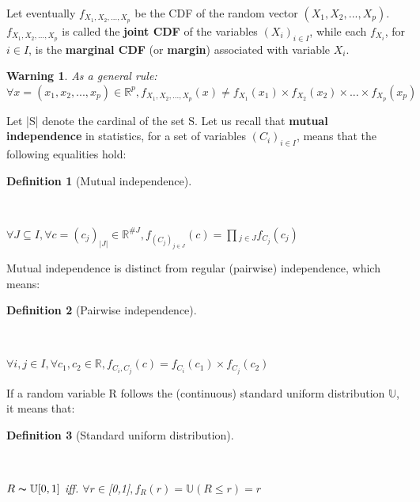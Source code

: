 \documentclass{report}
\newtheorem{definition}{Definition}[section]
\newtheorem{warning}{Warning}[section]
\begin{document}
{Let eventually $f_{X_1, X_2, ..., X_p}$ be the CDF of the random vector $(X_1, X_2, ..., X_p)$. $f_{X_1, X_2, ..., X_p}$ is called the \textbf{joint CDF} of the variables $(X_i)_{i \in I}$, while each $f_{X_i}$, for $i \in I$, is the \textbf{marginal CDF} (or \textbf{margin}) associated with variable $X_i$.

\begin{warning}{As a general rule:\\$\forall x = (x_1, x_2, ..., x_p) \in \mathbb{R}^p, f_{X_1, X_2, ..., X_p}(x) \neq f_{X_1}(x_1) \times f_{X_2}(x_2) \times ... \times f_{X_p}(x_p)$}\end{warning}

Let |S| denote the cardinal of the set S. Let us recall that \textbf{mutual independence} in statistics, for a set of variables $(C_i)_{i \in I}$, means that the following equalities hold:

\begin{definition}[Mutual independence]\label{mutualindependence}{~ \\ \begin{center}$\forall J \subseteq I, \forall c = (c_j)_{|J|} \in \mathbb{R}^{\#J}, f_{(C_j)_{j \in J}}(c) = \prod{_{j \in J}}{f_{C_j}(c_j)}$\end{center}}\end{definition}

Mutual independence is distinct from regular (pairwise) independence, which means:

\begin{definition}[Pairwise independence]\label{independence}{~ \\\begin{center}$\forall i, j \in I, \forall c_1, c_2 \in \mathbb{R}, f_{C_i, C_j}(c) = f_{C_i}(c_1) \times f_{C_j}(c_2)$\end{center}}\end{definition}

If a random variable R follows the (continuous) standard uniform distribution $\mathbb{U}$, it means that:

\begin{definition}[Standard uniform distribution]\label{standarduniform}{~ \\\begin{center}$R \thicksim \mathbb{U}[0,1]$ iff. $\forall r \in $[0,1]$, f_{R}(r) = \mathbb{U}(R \leq r) = r$\end{center}}\end{definition}

}
\end{document}
